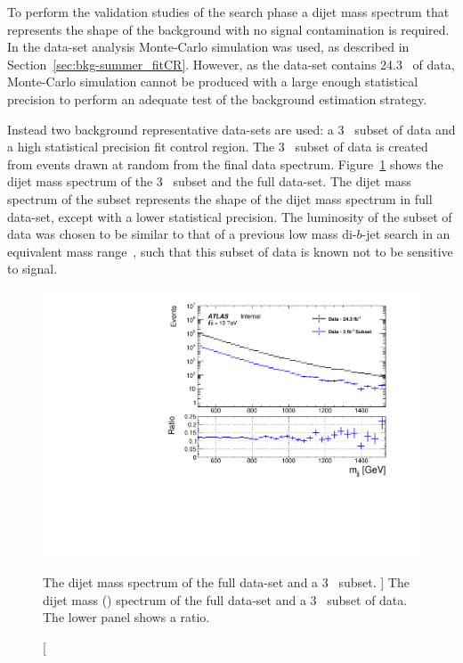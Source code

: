 To perform the validation studies of the \lm{} search phase
a dijet mass spectrum that represents the shape of the background with no signal contamination is required.
In the \summer{} data-set analysis Monte-Carlo simulation was used,
as described in Section~\ref{sec:bkg-summer_fitCR}.
However, as the \lm{} data-set contains 24.3~\ifb{} of data, Monte-Carlo simulation cannot be produced with a large enough statistical
precision to perform an adequate test of the background estimation strategy.

Instead two background representative data-sets are used:
a 3~\ifb{} subset of data and a high statistical precision fit control region.
The 3~\ifb{} subset of data is created from events drawn at random from the final data spectrum.
Figure~\ref{fig:fittingDataSubset} shows the dijet mass spectrum of the 3~\ifb{} subset and the full \lm{} data-set.
The dijet mass spectrum of the subset represents the shape of the dijet mass spectrum in full data-set,
except with a lower statistical precision.
The luminosity of the subset of data was chosen to be similar to that of a
previous low mass di-$b$-jet search in an equivalent mass range~\cite{dibjet-lhcp_conf},
such that this subset of data is known not to be sensitive to signal.

\begin{figure}[!htb]
\captionsetup[subfigure]{aboveskip=0pt,justification=centering}
\centering
\includegraphics[width=0.7\linewidth, angle=0]{figs/Dibjet/LowMass/FitStudy/subset_dataComp.pdf}
\vspace{-1em}
\caption
    [ The dijet mass spectrum of the full \lm{} data-set and a 3~\ifb{} subset.
      ]
    {\label{fig:fittingDataSubset}
      The dijet mass (\mjj{}) spectrum of the full \lm{} data-set and a 3~\ifb{} subset of \lm{} data.
      The lower panel shows a ratio.}
    \vspace{-1em}
\end{figure}


